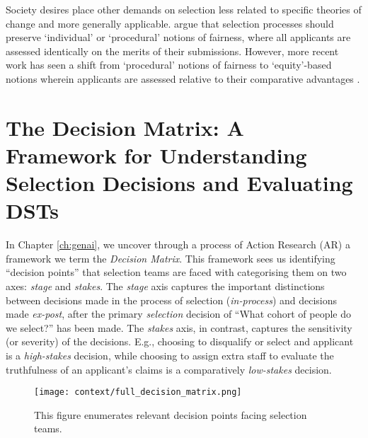 Society desires place other demands on selection less related to specific theories of change and more generally applicable. \textcite{dwork_fairness_2012} argue that selection processes should preserve `individual' or `procedural' notions of fairness, where all applicants are assessed identically on the merits of their submissions. However, more recent work has seen a shift from `procedural' notions of fairness to `equity'-based notions wherein applicants are assessed relative to their comparative advantages \cite{Ahnaf2023AHPAP}.

\section{The Decision Matrix: A Framework for Understanding Selection Decisions and Evaluating DSTs}
In Chapter \ref{ch:genai}, we uncover through a process of Action Research (AR) a framework we term the \emph{Decision Matrix}. This framework sees us identifying ``decision points'' that selection teams are faced with categorising them on two axes: \emph{stage} and \emph{stakes}. The \emph{stage} axis captures the important distinctions between decisions made in the process of selection (\emph{in-process}) and decisions made \emph{ex-post}, after the primary \emph{selection} decision of ``What cohort of people do we select?'' has been made. The \emph{stakes} axis, in contrast, captures the sensitivity (or severity) of the decisions. E.g., choosing to disqualify or select and applicant is a \emph{high-stakes} decision, while choosing to assign extra staff to evaluate the truthfulness of an applicant's claims is a comparatively \emph{low-stakes} decision.

\begin{figure}[htbp]
  \centering
  \texttt{[image: context/full\_decision\_matrix.png]}
  \caption{This figure enumerates relevant decision points facing selection teams.}
  \label{tab:full_decision_list}
\end{figure}

